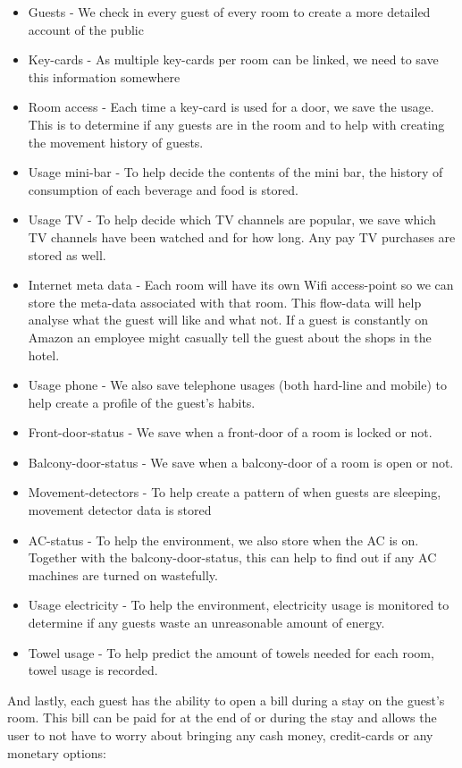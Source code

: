 \begin{itemize}
	\item Guests - We check in every guest of every room to create a more detailed account of the public
	\item Key-cards - As multiple key-cards per room can be linked, we need to save this information somewhere
	\item Room access - Each time a key-card is used for a door, we save the usage. This is to determine if any guests are in the room and to help with creating the movement history of guests.
	\item Usage mini-bar - To help decide the contents of the mini bar, the history of consumption of each beverage and food is stored.
	\item Usage TV - To help decide which TV channels are popular, we save which TV channels have been watched and for how long. Any pay TV purchases are stored as well.
	\item Internet meta data - Each room will have its own Wifi access-point so we can store the meta-data associated with that room. This flow-data will help analyse what the guest will like and what not. If a guest is constantly on Amazon an employee might casually tell the guest about the shops in the hotel.
	\item Usage phone - We also save telephone usages (both hard-line and mobile) to help create a profile of the guest's habits.
	\item Front-door-status - We save when a front-door of a room is locked or not.
	\item Balcony-door-status - We save when a balcony-door of a room is open or not.
	\item Movement-detectors - To help create a pattern of when guests are sleeping, movement detector data is stored
	\item AC-status - To help the environment, we also store when the AC is on. Together with the balcony-door-status, this can help to find out if any AC machines are turned on wastefully.
	\item Usage electricity - To help the environment, electricity usage is monitored to determine if any guests waste an unreasonable amount of energy.
	\item Towel usage - To help predict the amount of towels needed for each room, towel usage is recorded. 
\end{itemize}

And lastly, each guest has the ability to open a bill during a stay on the guest's room. This bill can be paid for at the end of or during the stay and allows the user to not have to worry about bringing any cash money, credit-cards or any monetary options:


